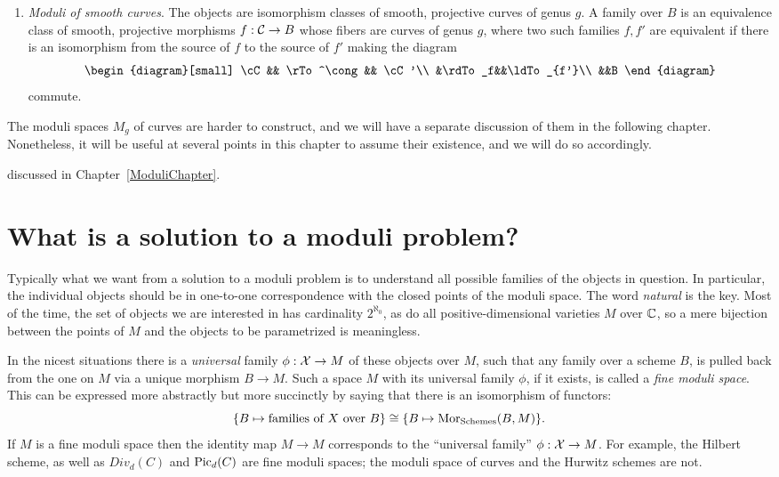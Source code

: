 \begin{enumerate}
\item \emph{Moduli of smooth curves}. The objects are isomorphism classes of smooth, projective curves of genus $g$. A family over $B$ is an equivalence class of smooth, projective morphisms $f : \mathcal C \to B$ whose fibers are curves of genus $g$, where two such families $f, f'$
are equivalent if there is an isomorphism from the source of $f$ to the source
of $f'$ making the diagram
$$
\begin{diagram}[small]
\cC && \rTo^\cong && \cC'\\
&\rdTo_f&&\ldTo_{f'}\\
&&B
\end{diagram}
$$
commute.
\end{enumerate}

The moduli spaces $M_g$ of curves are harder to construct, and we will have a separate discussion of them in the following chapter. Nonetheless, it will be useful at several points in this chapter to assume their existence, and we will do so accordingly.

discussed in Chapter~\ref{ModuliChapter}.

\section{What is a solution to a moduli problem?}

Typically what we want from a solution to a moduli problem is to understand all possible families of the objects
in question. In particular, the individual objects should be in one-to-one correspondence with the closed points of the
moduli space.  The word \emph{natural} is the key. Most of the time, the set of objects we are interested in has cardinality $2^{\aleph_0}$, as do all positive-dimensional varieties $M$ over ${\mathbb C}$, so a mere  bijection between the points of $M$ and the objects to be parametrized is meaningless.

In the nicest situations there is a \emph{universal} family $\phi: {\mathcal X}\to M$ of these objects over $M$,
such that any family over a scheme $B$,  is pulled back from the one on $M$ via a unique morphism $B\to M.$  Such a space $M$ with its universal family $\phi$, if it exists, is called a \emph{fine moduli space}. This can be expressed more abstractly but more succinctly by saying that there is an isomorphism of functors:
$$
\{ B \mapsto \text{families of } X \text{ over } B \} \cong \{ B\mapsto {\rm{Mor}}_{{\rm Schemes}}(B, M) \}.
$$
If $M$ is a fine moduli space then the identity map $M\to M$ corresponds to the ``universal family'' $\phi: {\mathcal X} \to M$. 
For example, the Hilbert scheme, as well as $Div_d(C)$ and $\operatorname{Pic}_d(C)$ are fine moduli spaces; the moduli space of curves
and the Hurwitz schemes are not.

